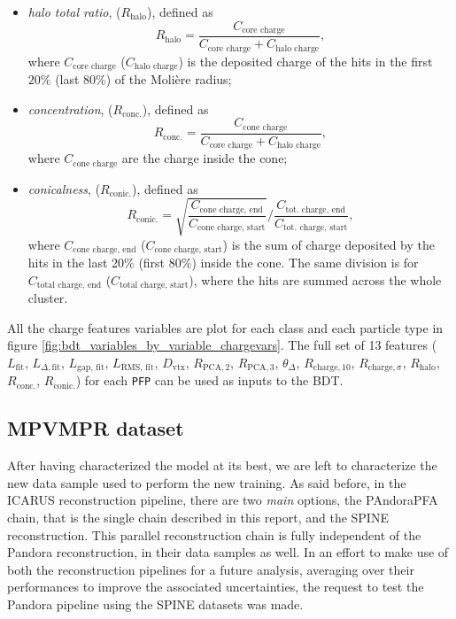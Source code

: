 \begin{itemize}
    \item \emph{halo total ratio}, ($R_\mathrm{halo}$), defined as \begin{equation*}
        R_\mathrm{halo} = \frac{C_\text{core charge}}{C_\text{core charge} + C_\text{halo charge}}, 
    \end{equation*} where $C_\text{core charge}$ ($C_\text{halo charge}$) is the deposited charge of the hits in the first $20\%$ (last $80\%$) of the Molière radius; 
    \item \emph{concentration}, ($R_\mathrm{conc.}$), defined as \begin{equation*}
        R_\mathrm{conc.} = \frac{C_\text{cone charge}}{C_\text{core charge} + C_\text{halo charge}},
    \end{equation*} where $C_\text{cone charge}$ are the charge inside the cone; 
    \item \emph{conicalness}, ($R_\mathrm{conic.}$), defined as \begin{equation*}
        R_\mathrm{conic.} = \sqrt{\frac{C_\text{cone charge, end}}{C_\text{cone charge, start}}} \Big/ \frac{C_\text{tot. charge, end}}{C_\text{tot. charge, start}}, 
    \end{equation*} where $C_\text{cone charge, end}$ ($C_\text{cone charge, start}$) is the sum of charge deposited by the hits in the last 20\% (first 80\%) inside the cone. The same division is for $C_\text{total charge, end}$ ($C_\text{total charge, start}$), where the hits are summed across the whole cluster. 
\end{itemize} All the charge features variables are plot for each class and each particle type in figure \ref{fig:bdt_variables_by_variable_chargevars}. The full set of 13 features ($L_\text{fit}$, $L_{\Delta, \text{fit}}$, $L_{\text{gap, fit}}$, $L_{\text{RMS, fit}}$, $D_\text{vtx}$, $R_{\mathrm{PCA}, 2}$, $R_{\mathrm{PCA}, 3}$, $\theta_\Delta$, $R_\mathrm{charge, 10}$, $R_\mathrm{charge, \sigma}$, $R_\mathrm{halo}$, $R_\mathrm{conc.}$, $R_\mathrm{conic.}$) for each \texttt{PFP} can be used as inputs to the BDT. 

\subsection{MPVMPR dataset} 

After having characterized the model at its best, we are left to characterize the new data sample used to perform the new training. As said before, in the ICARUS reconstruction pipeline, there are two \emph{main} options, the PAndoraPFA chain, that is the single chain described in this report, and the SPINE \cite{Drielsma:2021jdv} reconstruction. This parallel reconstruction chain is fully independent of the Pandora reconstruction, in their data samples as well. In an effort to make use of both the reconstruction pipelines for a future analysis, averaging over their performances to improve the associated uncertainties, the request to test the Pandora pipeline using the SPINE datasets was made. 

